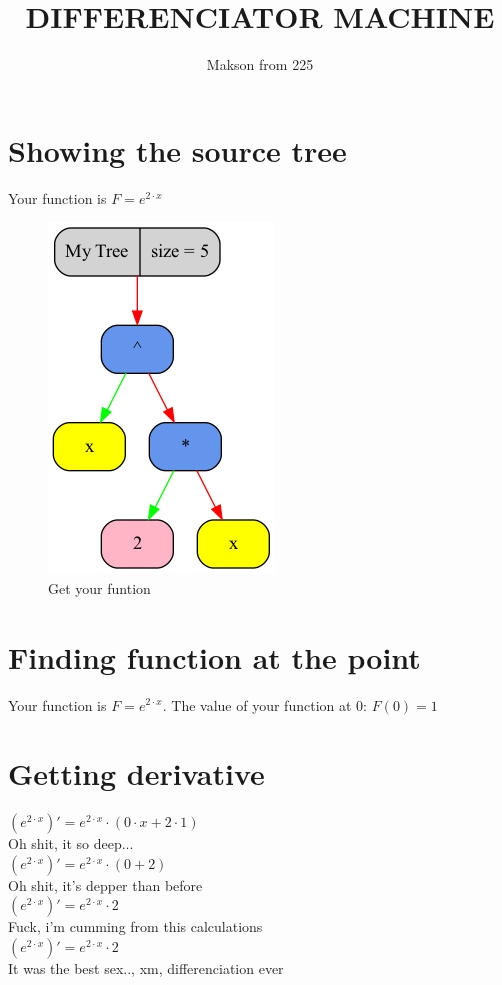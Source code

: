 \documentclass[12pt, letterpaper, twoside]{article}
\title{DIFFERENCIATOR MACHINE}
\author{Makson from 225}
\date{}
\begin{document}
\maketitle
\newpage
\section{Showing the source tree}
\begin{center}
Your function is $F = e^{2 \cdot x}$\newline 
\begin{figure}
\begin{center}
\includegraphics [scale = 0.4]{graphics/graph1.png}
\caption{Get your funtion}
\end{center}
\end{figure}
\end{center}
\newpage
\section{Finding function at the point}
\begin{center}
Your function is $F = e^{2 \cdot x}$.
The value of your function at 0: $ F(0) = 1 $
\end{center}
\newpage
\section{Getting derivative}
\begin{center}
$(e^{2 \cdot x})' = e^{2 \cdot x} \cdot (0 \cdot x + 2 \cdot 1)$\\
Oh shit, it so deep...\\
$(e^{2 \cdot x})' = e^{2 \cdot x} \cdot (0 + 2)$\\
Oh shit, it's depper than before\\
$(e^{2 \cdot x})' = e^{2 \cdot x} \cdot 2$\\
Fuck, i'm cumming from this calculations\\
$(e^{2 \cdot x})' = e^{2 \cdot x} \cdot 2$\\
It was the best sex.., xm, differenciation ever
\end{center}
\newpage
\end{document}
